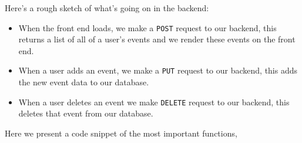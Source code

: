\vspace{0.2cm}
Here's a rough sketch of what's going on in the backend:

\begin{itemize}
\item When the front end loads, we make a \texttt{POST} request to our backend, this returns a list of all of a user's events and we render these events on the front end. \\
\item When a user adds an event, we make a \texttt{PUT} request to our backend, this adds the new event data to our database. \\
\item When a user deletes an event we make \texttt{DELETE} request to our backend, this deletes that event from our database. \\
\end{itemize}

Here we present a code snippet of the most important functions,

